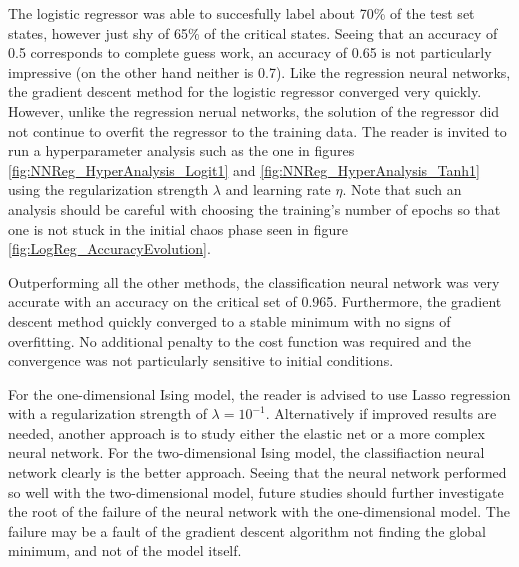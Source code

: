 \documentclass[nofootinbib,reprint,english]{revtex4-1}
\begin{document}
The logistic regressor was able to succesfully label about 70\% of the test set states, however just shy of 65\% of the critical states. Seeing that an accuracy of 0.5 corresponds to complete guess work, an accuracy of 0.65 is not particularly impressive (on the other hand neither is 0.7). Like the regression neural networks, the gradient descent method for the logistic regressor converged very quickly. However, unlike the regression nerual networks, the solution of the regressor did not continue to overfit the regressor to the training data. The reader is invited to run a hyperparameter analysis such as the one in figures \ref{fig:NNReg_HyperAnalysis_Logit1} and \ref{fig:NNReg_HyperAnalysis_Tanh1} using the regularization strength \(\lambda\) and learning rate \(\eta\). Note that such an analysis should be careful with choosing the training's number of epochs so that one is not stuck in the initial chaos phase seen in figure \ref{fig:LogReg_AccuracyEvolution}.

Outperforming all the other methods, the classification neural network was very accurate with an accuracy on the critical set of 0.965. Furthermore, the gradient descent method quickly converged to a stable minimum with no signs of overfitting. No additional penalty to the cost function was required and the convergence was not particularly sensitive to initial conditions.

For the one-dimensional Ising model, the reader is advised to use Lasso regression with a regularization strength of \(\lambda=10^{-1}\). Alternatively if improved results are needed, another approach is to study either the elastic net or a more complex neural network. For the two-dimensional Ising model, the classifiaction neural network clearly is the better approach. Seeing that the neural network performed so well with the two-dimensional model, future studies should further investigate the root of the failure of the neural network with the one-dimensional model. The failure may be a fault of the gradient descent algorithm not finding the global minimum, and not of the model itself.
\end{document}
